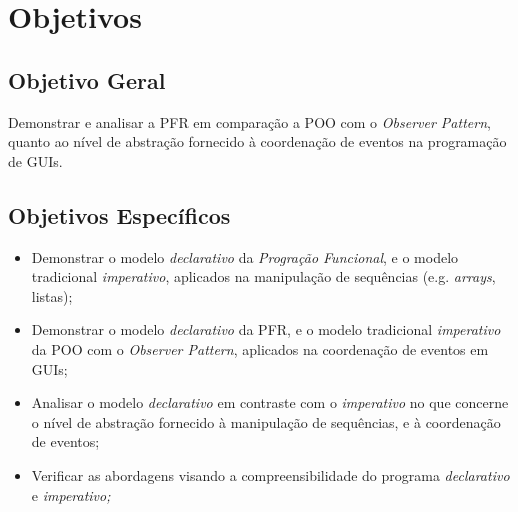 \section{Objetivos}\label{lobjetivos}

\subsection{Objetivo Geral}

Demonstrar e analisar a PFR em comparação a POO com o
\emph{Observer Pattern}, quanto ao nível de abstração
fornecido à coordenação de eventos na programação de GUIs.

\subsection{Objetivos Específicos}

\begin{itemize}[noitemsep]
  \item Demonstrar o modelo \emph{declarativo} da
        \emph{Progração Funcional}, e o modelo tradicional \emph{imperativo},
        aplicados na manipulação de sequências (e.g. \emph{arrays}, listas);
  \item Demonstrar o modelo \emph{declarativo} da PFR,
        e o modelo tradicional \emph{imperativo} da POO
        com o \emph{Observer Pattern}, aplicados na coordenação
        de eventos em GUIs;
  \item Analisar o modelo \emph{declarativo} em contraste com o
        \emph{imperativo} no que concerne o nível de abstração
        fornecido à manipulação de sequências,
        e à coordenação de eventos;
  \item Verificar as abordagens visando a compreensibilidade
        do programa \emph{declarativo} e \emph{imperativo;}
\end{itemize}
